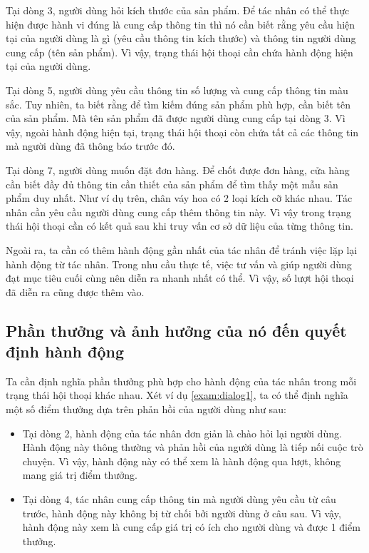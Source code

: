 Tại dòng 3, người dùng hỏi kích thước của sản phẩm. Để tác nhân
có thể thực hiện được hành vi đúng là cung cấp thông tin thì nó
cần biết rằng yêu cầu hiện tại của người dùng là gì (yêu cầu
thông tin kích thước) và thông tin người dùng cung cấp (tên
sản phẩm). Vì vậy, trạng thái hội thoại cần chứa hành động
hiện tại của người dùng.

Tại dòng 5, người dùng yêu cầu thông tin số lượng và cung cấp
thông tin màu sắc. Tuy nhiên, ta biết rằng để tìm kiếm đúng sản phẩm
phù hợp, cần biết tên của sản phẩm. Mà tên sản phẩm đã được
người dùng cung cấp tại dòng 3. Vì vậy, ngoài hành động hiện tại,
trạng thái hội thoại còn chứa tất cả các thông tin mà người dùng đã
thông báo trước đó.

Tại dòng 7, người dùng muốn đặt đơn hàng. Để chốt được đơn hàng,
cửa hàng cần biết đầy đủ thông tin cần thiết của sản phẩm để tìm thấy
một mẫu sản phẩm duy nhất. Như ví dụ trên, chân váy hoa có 2 loại
kích cỡ khác nhau. Tác nhân cần yêu cầu người dùng cung cấp thêm
thông tin này. Vì vậy trong trạng thái hội thoại cần có kết quả
sau khi truy vấn cơ sở dữ liệu của từng thông tin.

Ngoài ra, ta cần có thêm hành động gần nhất của tác nhân để tránh
việc lặp lại hành động từ tác nhân. Trong nhu cầu thực tế, việc
tư vấn và giúp người dùng đạt mục tiêu cuối cùng nên diễn ra
nhanh nhất có thể. Vì vậy, số lượt hội thoại đã diễn ra
cũng được thêm vào.

\subsection{Phần thưởng và ảnh hưởng của nó đến quyết định hành động}
\label{subsec:reward}
Ta cần định nghĩa phần thưởng phù hợp cho hành động của tác nhân
trong mỗi trạng thái hội thoại khác nhau. Xét ví dụ
\ref{exam:dialog1}, ta có thể định nghĩa một số điểm thưởng
dựa trên phản hồi của người dùng như sau:

\begin{itemize}
    \item Tại dòng 2, hành động của tác nhân đơn giản là chào hỏi lại
    người dùng. Hành động này thông thường và phản hồi của người dùng
    là tiếp nối cuộc trò chuyện. Vì vậy, hành động này có thể xem là
    hành động qua lượt, không mang giá trị điểm thưởng.
    \item Tại dòng 4, tác nhân cung cấp thông tin mà người dùng
    yêu cầu từ câu trước, hành động này không bị từ chối bởi
    người dùng ở câu sau. Vì vậy, hành động này xem là cung cấp
    giá trị có ích cho người dùng và được 1 điểm thưởng.
\end{itemize}

